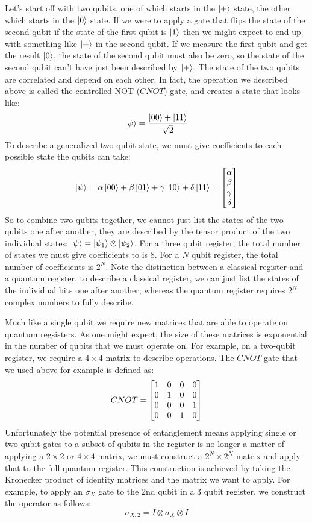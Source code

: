 Let's start off with two qubits, one of which starts in the $\ket{+}$ state, the other which starts in
the $\ket{0}$ state. If we were to apply a gate that flips the state of the second qubit if the state of
the first qubit is $\ket{1}$ then we might expect to end up with something like $\ket{+}$ in the second
qubit. If we measure the first qubit and get the result $\ket{0}$, the state of the second qubit must also
be zero, so the state of the second qubit can't have just been described by $\ket{+}$. The state of the two
qubits are correlated and depend on each other. In fact, the operation we described above is called the 
controlled-NOT ($CNOT$) gate, and creates a state that looks like:
\begin{equation}
  \ket{\psi} = \frac{\ket{00} + \ket{11}}{\sqrt{2}}
\end{equation}
To describe a generalized two-qubit state, we must give coefficients to each possible state the qubits
can take:
\begin{equation}
  \ket{\psi} = \alpha\ket{00} + \beta\ket{01} + \gamma\ket{10} + \delta\ket{11} = 
    \begin{bmatrix}\alpha\\\beta\\\gamma\\\delta\end{bmatrix}
\end{equation}
So to combine two qubits together, we cannot just list the states of the two qubits one after another,
they are described by the tensor product of the two individual states: $\ket{\psi} = \ket{\psi_1}\otimes\ket{\psi_2}$.
For a three qubit register, the total number of states we must give coefficients to is 8. For a $N$ qubit
register, the total number of coefficients is $2^N$. Note the distinction between a classical register
and a quantum register, to describe a classical register, we can just list the states of the individual
bits one after another, whereas the quantum register requires $2^N$ complex numbers to fully describe.

Much like a single qubit we require new matrices that are able to operate on quantum regsisters. As one 
might expect, the size of these matrices is exponential in the number of qubits that we must operate on.
For example, on a two-qubit register, we require a $4 \times 4$ matrix to describe operations. The $CNOT$
gate that we used above for example is defined as:
\begin{equation}
  CNOT = \begin{bmatrix}1&0&0&0\\0&1&0&0\\0&0&0&1\\0&0&1&0\end{bmatrix}
\end{equation}
Unfortunately the potential presence of entanglement means applying single or two qubit gates to a subset
of qubits in the register is no longer a matter of applying a $2 \times 2$ or $4 \times 4$ matrix, we must
construct a $2^N \times 2^N$ matrix and apply that to the full quantum register. This construction is achieved
by taking the Kronecker product of identity matrices and the matrix we want to apply. For example, to apply
an $\sigma_X$ gate to the 2nd qubit in a 3 qubit register, we construct the operator as follows:
\begin{equation}
  \sigma_{X,2} = I \otimes \sigma_X \otimes I
\end{equation}

